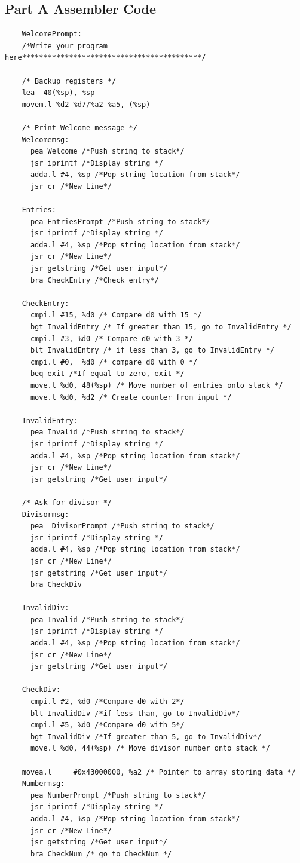 \documentclass[10pt, letterpaper, titlepage]{article} %
\begin{document}
\subsection{Part A Assembler Code}
\begin{lstlisting}
	WelcomePrompt:
	/*Write your program here******************************************/
	
	/* Backup registers */
	lea -40(%sp), %sp
	movem.l %d2-%d7/%a2-%a5, (%sp)
	
	/* Print Welcome message */
	Welcomemsg:
	  pea Welcome /*Push string to stack*/
	  jsr iprintf /*Display string */
	  adda.l #4, %sp /*Pop string location from stack*/
	  jsr cr /*New Line*/
	
	Entries:
	  pea EntriesPrompt /*Push string to stack*/
	  jsr iprintf /*Display string */
	  adda.l #4, %sp /*Pop string location from stack*/
	  jsr cr /*New Line*/
	  jsr getstring /*Get user input*/
	  bra CheckEntry /*Check entry*/
	
	CheckEntry:
	  cmpi.l #15, %d0 /* Compare d0 with 15 */
	  bgt InvalidEntry /* If greater than 15, go to InvalidEntry */
	  cmpi.l #3, %d0 /* Compare d0 with 3 */
	  blt InvalidEntry /* if less than 3, go to InvalidEntry */
	  cmpi.l #0,  %d0 /* compare d0 with 0 */
	  beq exit /*If equal to zero, exit */
	  move.l %d0, 48(%sp) /* Move number of entries onto stack */
	  move.l %d0, %d2 /* Create counter from input */
	
	InvalidEntry:
	  pea Invalid /*Push string to stack*/
	  jsr iprintf /*Display string */
	  adda.l #4, %sp /*Pop string location from stack*/
	  jsr cr /*New Line*/
	  jsr getstring /*Get user input*/
	
	/* Ask for divisor */
	Divisormsg:
	  pea  DivisorPrompt /*Push string to stack*/
	  jsr iprintf /*Display string */
	  adda.l #4, %sp /*Pop string location from stack*/
	  jsr cr /*New Line*/
	  jsr getstring /*Get user input*/
	  bra CheckDiv
	
	InvalidDiv:
	  pea Invalid /*Push string to stack*/
	  jsr iprintf /*Display string */
	  adda.l #4, %sp /*Pop string location from stack*/
	  jsr cr /*New Line*/
	  jsr getstring /*Get user input*/
	
	CheckDiv:
	  cmpi.l #2, %d0 /*Compare d0 with 2*/
	  blt InvalidDiv /*if less than, go to InvalidDiv*/
	  cmpi.l #5, %d0 /*Compare d0 with 5*/
	  bgt InvalidDiv /*If greater than 5, go to InvalidDiv*/
	  move.l %d0, 44(%sp) /* Move divisor number onto stack */
	
	movea.l     #0x43000000, %a2 /* Pointer to array storing data */
	Numbermsg:
	  pea NumberPrompt /*Push string to stack*/
	  jsr iprintf /*Display string */
	  adda.l #4, %sp /*Pop string location from stack*/
	  jsr cr /*New Line*/
	  jsr getstring /*Get user input*/
	  bra CheckNum /* go to CheckNum */
	

\end{lstlisting}
\end{document}

